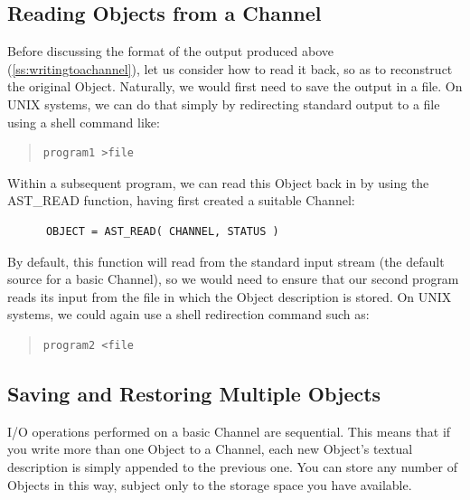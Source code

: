 \documentclass[twoside,11pt]{article}
\newcommand{\htmlref}[2]{#1}
\newcommand{\secref}[1]{\S\ref{#1}}
\renewcommand{\secref}[1]{\ref{#1}}
\begin{document}
\subsection{\label{ss:readingfromachannel}Reading Objects from a Channel}

Before discussing the format of the output produced above
(\secref{ss:writingtoachannel}), let us consider how to read it back,
so as to reconstruct the original \htmlref{Object}{Object}. Naturally, we would first
need to save the output in a file. On UNIX systems, we can do that
simply by redirecting standard output to a file using a shell command
like:

\begin{quote}
\small
\begin{verbatim}
program1 >file
\end{verbatim}
\normalsize
\end{quote}

Within a subsequent program, we can read this Object back in by
using the \htmlref{AST\_READ}{AST_READ} function, having first created a suitable
\htmlref{Channel}{Channel}:

\small
\begin{verbatim}
      OBJECT = AST_READ( CHANNEL, STATUS )
\end{verbatim}
\normalsize

By default, this function will read from the standard input stream
(the default source for a basic Channel), so we would need to ensure
that our second program reads its input from the file in which the
Object description is stored. On UNIX systems, we could again use a
shell redirection command such as:

\begin{quote}
\small
\begin{verbatim}
program2 <file
\end{verbatim}
\normalsize
\end{quote}

\subsection{Saving and Restoring Multiple Objects}

I/O operations performed on a basic \htmlref{Channel}{Channel} are sequential. This
means that if you write more than one \htmlref{Object}{Object} to a Channel,
each new Object's textual description is simply appended to the
previous one. You can store any number of Objects in this way,
subject only to the storage space you have available.
\end{document}

